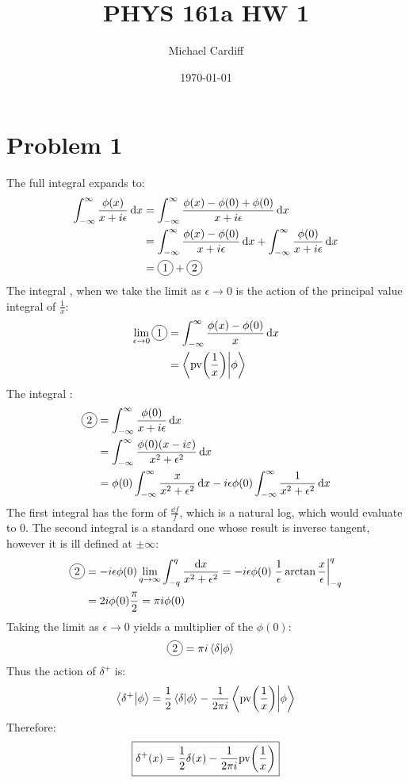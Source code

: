 \documentclass[12pt]{article}
\title{\vspace{-3em}PHYS 161a HW 1}
\author{Michael Cardiff}
\date{\today}
\newcommand*\circled[1]{\tikz[baseline=(char.base)]{
            \node[shape=circle,draw,inner sep=2pt] (char) {#1};}}
\newcommand{\infint}{\int_{-\infty}^\infty}
\begin{document}
\maketitle

\section*{Problem 1}
The full integral expands to:
\begin{align*}
  \int_{-\infty}^{\infty}\frac{\phi(x)}{x+i\epsilon}\dd{x}
  &=\infint\frac{\phi(x)-\phi(0)+\phi(0)}{x+i\epsilon}\dd{x}\\
  &=\infint\frac{\phi(x)-\phi(0)}{x+i\epsilon}\dd{x}+
  \infint\frac{\phi(0)}{x+i\epsilon}\dd{x}\\
  &=\circled{1}+\circled{2}
\end{align*}
The integral \circled{1}, when we take the limit as $\epsilon\to0$ is the action of the principal value integral of $\frac1x$:
\begin{align*}
  \lim_{\epsilon\to0}\circled{1}&=\infint\frac{\phi(x)-\phi(0)}{x}\dd{x}\\
  &=\ip{\mathrm{pv}\qty(\frac1x)}{\phi}
\end{align*}
The integral \circled{2}:
\begin{align*}
  \circled{2}&=\infint\frac{\phi(0)}{x+i\epsilon}\dd{x}\\
  &=\infint\frac{\phi(0)(x-i\varepsilon)}{x^2+\epsilon^2}\dd{x}\\
  &=\phi(0)\infint\frac{x}{x^2+\epsilon^2}\dd{x}
  -i\epsilon\phi(0)\infint\frac{1}{x^2+\epsilon^2}\dd{x}
\end{align*}
The first integral has the form of $\frac{\dd{f}}{f}$, which is a natural log, which would evaluate to $0$. The second integral is a standard one whose result is inverse tangent, however it is ill defined at $\pm\infty$:
\begin{align*}
  \circled{2}&=-i\epsilon\phi(0)\lim_{q\to\infty}
  \int_{-q}^q\frac{\dd{x}}{x^2+\epsilon^2}
  =-i\epsilon\phi(0)\eval{\frac{1}{\epsilon}\arctan\frac{x}{\epsilon}}_{-q}^q\\
  &=2i\phi(0)\frac{\pi}{2}=\pi i\phi(0)
\end{align*}
Taking the limit as $\epsilon\to0$ yields a multiplier of the $\phi(0)$:
\begin{align*}
  \circled{2}&=\pi i\ip{\delta}{\phi}
\end{align*}
Thus the action of $\delta^+$ is:
\begin{align*}
  \ip{\delta^+}{\phi}=\frac12\ip{\delta}{\phi}
  -\frac{1}{2\pi i}\ip{\mathrm{pv}\qty(\frac1x)}{\phi}
\end{align*}
Therefore:
\begin{align}
  \boxed{
    \delta^+(x)=\frac12\delta(x)-\frac1{2\pi i}\mathrm{pv}\qty(\frac1x)
  }
\end{align}
\end{document}
